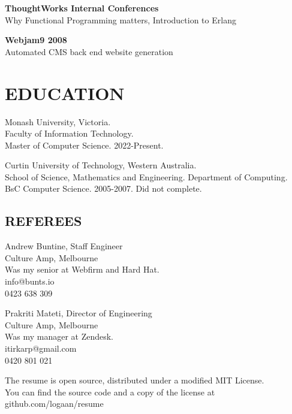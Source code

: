\documentclass[margin]{res}
\begin{document}
\begin{resume}
\begin{multicols}{2}
    \textbf{ThoughtWorks Internal Conferences} \\
    Why Functional Programming matters, Introduction to Erlang

    \textbf{Webjam9 2008} \\
    Automated CMS back end website generation
  \end{multicols}

  \section{EDUCATION}
  Monash University, Victoria. \\
  Faculty of Information Technology. \\
  Master of Computer Science. 2022-Present.
  
  Curtin University of Technology, Western Australia. \\
  School of Science, Mathematics and
  Engineering. Department of Computing. \\
  BsC Computer Science. 2005-2007. Did not complete.

  \begin{multicols}{2}
    \section{REFEREES}
    Andrew Buntine, Staff Engineer \\
    Culture Amp, Melbourne \\
    Was my senior at Webfirm and Hard Hat. \\
    info@bunts.io \\
    0423 638 309

	Prakriti Mateti, Director of Engineering \\
	Culture Amp, Melbourne \\
	Was my manager at Zendesk. \\
	itirkarp@gmail.com \\
	0420 801 021
  \end{multicols}

\end{resume} 

\centering
\hspace{-1.75in} The resume is open source, distributed under a modified MIT
License. \\
\hspace{-1.75in} You can find the source code and a copy of the license at
github.com/logaan/resume
\end{document}
